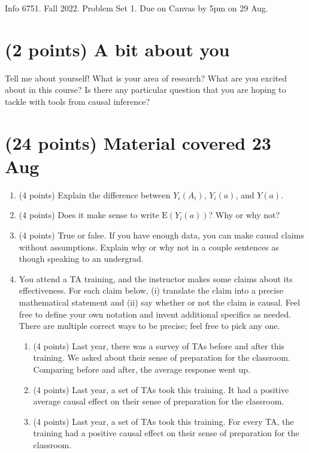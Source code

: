 \documentclass[10pt]{article}
\newcommand{\E}{\textrm{E}}
\begin{document}
\begin{Large} 
Info 6751. Fall 2022. Problem Set 1. Due on Canvas by 5pm on 29 Aug.
\end{Large}
\hline

\setcounter{section}{-1}
\section{(2 points) A bit about you}

Tell me about yourself! What is your area of research? What are you excited about in this course? Is there any particular question that you are hoping to tackle with tools from causal inference?

\section{(24 points) Material covered 23 Aug}

\begin{enumerate}
    \item (4 points) Explain the difference between $Y_i(A_i)$, $Y_i(a)$, and $Y(a)$.
    \item (4 points) Does it make sense to write $\E(Y_i(a))$? Why or why not?
    \item (4 points) True or false. If you have enough data, you can make causal claims without assumptions. Explain why or why not in a couple sentences as though speaking to an undergrad.
    \item You attend a TA training, and the instructor makes some claims about its effectiveness. For each claim below, (i) translate the claim into a precise mathematical statement and (ii) say whether or not the claim is causal. Feel free to define your own notation and invent additional specifics as needed. There are multiple correct ways to be precise; feel free to pick any one.
\begin{enumerate}
    \item (4 points) Last year, there was a survey of TAs before and after this training. We asked about their sense of preparation for the classroom. Comparing before and after, the average response went up.
    \item (4 points) Last year, a set of TAs took this training. It had a positive average causal effect on their sense of preparation for the classroom.
    \item (4 points) Last year, a set of TAs took this training. For every TA, the training had a positive causal effect on their sense of preparation for the classroom.
\end{enumerate}
\end{enumerate}
\end{document}
